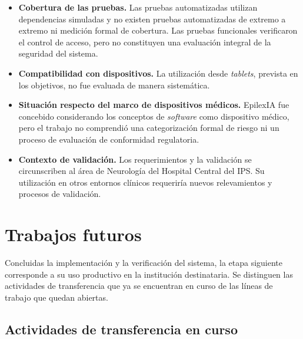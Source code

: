 \begin{itemize}
    \item \textbf{Cobertura de las pruebas.}
    Las pruebas automatizadas utilizan dependencias simuladas y no existen pruebas automatizadas de extremo a extremo ni medición formal de cobertura.
    Las pruebas funcionales verificaron el control de acceso, pero no constituyen una evaluación integral de la seguridad del sistema.

    \item \textbf{Compatibilidad con dispositivos.}
    La utilización desde \textit{tablets}, prevista en los objetivos, no fue evaluada de manera sistemática.

    \item \textbf{Situación respecto del marco de dispositivos médicos.}
    EpilexIA fue concebido considerando los conceptos de \textit{software} como dispositivo médico, pero el trabajo no comprendió una categorización formal de riesgo ni un proceso de evaluación de conformidad regulatoria.

    \item \textbf{Contexto de validación.}
    Los requerimientos y la validación se circunscriben al área de Neurología del Hospital Central del IPS.
    Su utilización en otros entornos clínicos requeriría nuevos relevamientos y procesos de validación.
\end{itemize}


\section{Trabajos futuros}
\label{sec:trabajos-futuros}

Concluidas la implementación y la verificación del sistema, la etapa siguiente corresponde a su uso productivo en la institución destinataria.
Se distinguen las actividades de transferencia que ya se encuentran en curso de las líneas de trabajo que quedan abiertas.

\subsection{Actividades de transferencia en curso}
\label{subsec:actividades-en-curso}

